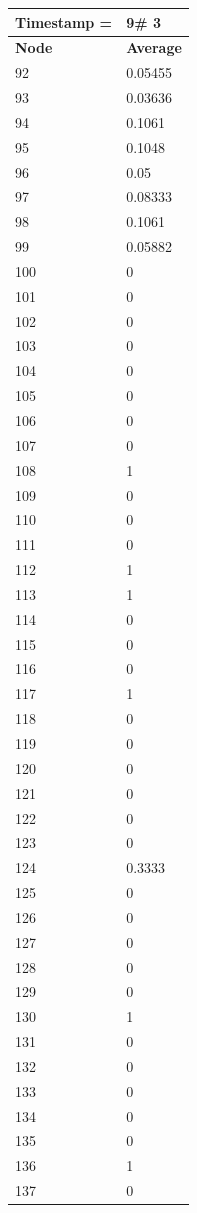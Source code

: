 \begin{tabular}{|l||l|}
\hline
\textbf{Timestamp =} & \textbf{9}\# 3\\\hline
	\textbf{Node} & \textbf{Average} \\ \hline
\hline
	92 & 0.05455 \\ \hline
	93 & 0.03636 \\ \hline
	94 & 0.1061 \\ \hline
	95 & 0.1048 \\ \hline
	96 & 0.05 \\ \hline
	97 & 0.08333 \\ \hline
	98 & 0.1061 \\ \hline
	99 & 0.05882 \\ \hline
	100 & 0 \\ \hline
	101 & 0 \\ \hline
	102 & 0 \\ \hline
	103 & 0 \\ \hline
	104 & 0 \\ \hline
	105 & 0 \\ \hline
	106 & 0 \\ \hline
	107 & 0 \\ \hline
	108 & 1 \\ \hline
	109 & 0 \\ \hline
	110 & 0 \\ \hline
	111 & 0 \\ \hline
	112 & 1 \\ \hline
	113 & 1 \\ \hline
	114 & 0 \\ \hline
	115 & 0 \\ \hline
	116 & 0 \\ \hline
	117 & 1 \\ \hline
	118 & 0 \\ \hline
	119 & 0 \\ \hline
	120 & 0 \\ \hline
	121 & 0 \\ \hline
	122 & 0 \\ \hline
	123 & 0 \\ \hline
	124 & 0.3333 \\ \hline
	125 & 0 \\ \hline
	126 & 0 \\ \hline
	127 & 0 \\ \hline
	128 & 0 \\ \hline
	129 & 0 \\ \hline
	130 & 1 \\ \hline
	131 & 0 \\ \hline
	132 & 0 \\ \hline
	133 & 0 \\ \hline
	134 & 0 \\ \hline
	135 & 0 \\ \hline
	136 & 1 \\ \hline
	137 & 0 \\ \hline
\end{tabular}

